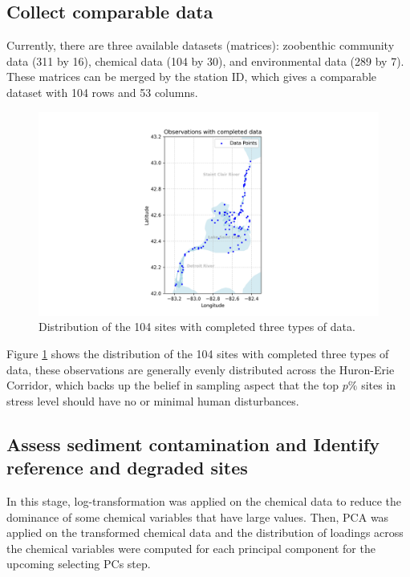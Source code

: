 \subsection{Collect comparable data}

Currently, there are three available datasets (matrices): zoobenthic community data (311 by 16),
chemical data (104 by 30), and environmental data (289 by 7).
These matrices can be merged by the station ID, which gives a comparable dataset with 104 rows
and 53 columns. 

\begin{figure}[!h]
    \centering
    \includegraphics[width=\textwidth]{../results/preliminary_results/merged_104_completed_observations.png}
    \caption{Distribution of the 104 sites with completed three types of data.}
    \label{fig:merged_104_completed_observations}
\end{figure}

Figure \textcolor{blue}{\ref{fig:merged_104_completed_observations}} shows the distribution of the 104 sites
with completed three types of data, these observations are generally evenly distributed
across the Huron-Erie Corridor, which backs up the belief in sampling aspect that the top \(p\%\) sites
in stress level should have no or minimal human disturbances.

\subsection{Assess sediment contamination and Identify reference and degraded sites}

In this stage, log-transformation was applied on the chemical data to 
reduce the dominance of some chemical variables that have large values. 
Then, PCA was applied on the transformed chemical data 
and the distribution of loadings across the chemical variables
were computed for each principal component for the upcoming selecting PCs step.

